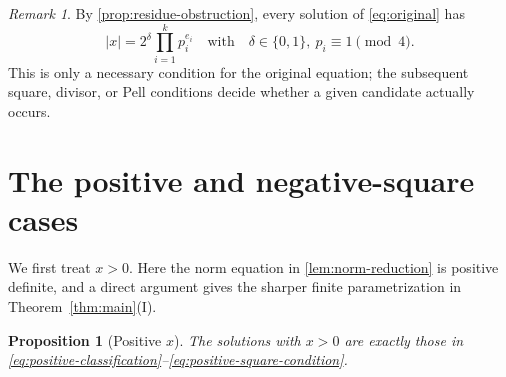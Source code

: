\documentclass[a4paper,11pt]{amsart}
\newtheorem{proposition}[proposition]{Proposition}
\theoremstyle{definition}
\theoremstyle{remark}
\newtheorem{remark}[remark]{Remark}
\begin{document}
\begin{remark}\label{rem:candidate-x}
By \cref{prop:residue-obstruction}, every solution of \eqref{eq:original} has
\[
|x|=2^\delta\prod_{i=1}^k p_i^{e_i}
\quad\text{with}\quad
\delta\in\{0,1\},\ p_i\equiv1\pmod4.
\]
This is only a necessary condition for the original equation; the subsequent square, divisor, or Pell conditions decide whether a given candidate actually occurs.
\end{remark}

\section{The positive and negative-square cases}

We first treat $x>0$.  Here the norm equation in \cref{lem:norm-reduction} is positive definite, and a direct argument gives the sharper finite parametrization in Theorem~\ref{thm:main}\textup{(I)}.

\begin{proposition}[Positive $x$]\label{prop:positive-x}
The solutions with $x>0$ are exactly those in \eqref{eq:positive-classification}--\eqref{eq:positive-square-condition}.
\end{proposition}
\end{document}
